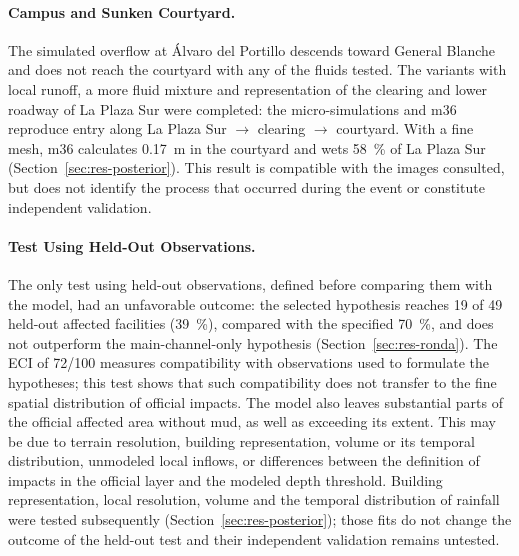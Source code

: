 \paragraph{Campus and Sunken Courtyard.} The simulated overflow at Álvaro del Portillo descends toward General Blanche and does not reach the courtyard with any of the fluids tested. The variants with local runoff, a more fluid mixture and representation of the clearing and lower roadway of La Plaza Sur were completed: the micro-simulations and m36 reproduce entry along La Plaza Sur $\rightarrow$ clearing $\rightarrow$ courtyard. With a fine mesh, m36 calculates \SI{0.17}{m} in the courtyard and wets \SI{58}{\percent} of La Plaza Sur (Section~\ref{sec:res-posterior}). This result is compatible with the images consulted, but does not identify the process that occurred during the event or constitute independent validation.

\paragraph{Test Using Held-Out Observations.} The only test using held-out observations, defined before comparing them with the model, had an unfavorable outcome: the selected hypothesis reaches 19 of 49 held-out affected facilities (\SI{39}{\percent}), compared with the specified \SI{70}{\percent}, and does not outperform the main-channel-only hypothesis (Section~\ref{sec:res-ronda}). The ECI of 72/100 measures compatibility with observations used to formulate the hypotheses; this test shows that such compatibility does not transfer to the fine spatial distribution of official impacts. The model also leaves substantial parts of the official affected area without mud, as well as exceeding its extent. This may be due to terrain resolution, building representation, volume or its temporal distribution, unmodeled local inflows, or differences between the definition of impacts in the official layer and the modeled depth threshold. Building representation, local resolution, volume and the temporal distribution of rainfall were tested subsequently (Section~\ref{sec:res-posterior}); those fits do not change the outcome of the held-out test and their independent validation remains untested.

